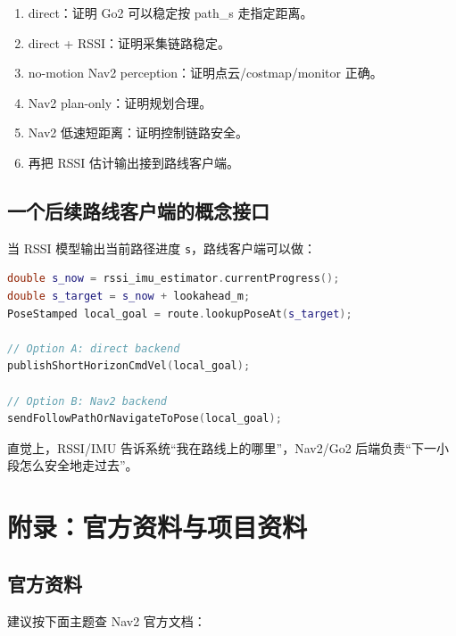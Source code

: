 \documentclass[UTF8,11pt,a4paper,openany]{ctexrep}
\newcommand{\code}[1]{\nolinkurl{#1}}
\begin{document}
\begin{enumerate}
  \item direct：证明 Go2 可以稳定按 path\_s 走指定距离。
  \item direct + RSSI：证明采集链路稳定。
  \item no-motion Nav2 perception：证明点云/costmap/monitor 正确。
  \item Nav2 plan-only：证明规划合理。
  \item Nav2 低速短距离：证明控制链路安全。
  \item 再把 RSSI 估计输出接到路线客户端。
\end{enumerate}

\section{一个后续路线客户端的概念接口}

当 RSSI 模型输出当前路径进度 \code{s}，路线客户端可以做：

\begin{lstlisting}[language=C++]
double s_now = rssi_imu_estimator.currentProgress();
double s_target = s_now + lookahead_m;
PoseStamped local_goal = route.lookupPoseAt(s_target);

// Option A: direct backend
publishShortHorizonCmdVel(local_goal);

// Option B: Nav2 backend
sendFollowPathOrNavigateToPose(local_goal);
\end{lstlisting}

直觉上，RSSI/IMU 告诉系统“我在路线上的哪里”，Nav2/Go2 后端负责“下一小段怎么安全地走过去”。

\chapter{附录：官方资料与项目资料}

\section{官方资料}

建议按下面主题查 Nav2 官方文档：
\end{document}
